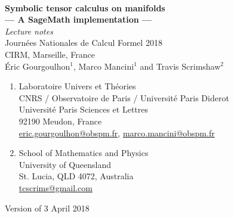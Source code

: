 \documentclass[12pt,a4paper]{book}
\begin{document}

\begin{titlepage}
\
\vspace{4cm}
\begin{center}
{\Huge\textbf{Symbolic tensor calculus on manifolds}}\\[2ex]
{\LARGE\textbf{--- A SageMath implementation ---}}\\[3ex]
{\LARGE\emph{Lecture notes}}\\[1ex]
{\Large Journées Nationales de Calcul Formel 2018\\[1ex]
CIRM, Marseille, France}\\[8ex]
{\large Éric Gourgoulhon$^1$, Marco Mancini$^1$ and Travis Scrimshaw$^2$}
\end{center}
\begin{enumerate}
\item Laboratoire Univers et Théories \\
CNRS / Observatoire de Paris / Université Paris Diderot\\
Université Paris Sciences et Lettres \\
92190 Meudon, France \\
\href{mailto:eric.gourgoulhon@obspm.fr}{eric.gourgoulhon@obspm.fr},
\href{mailto:marco.mancini@obspm.fr}{marco.mancini@obspm.fr}
\item School of Mathematics and Physics\\
University of Queensland \\
St. Lucia, QLD 4072, Australia \\
\href{mailto:tcscrims@gmail.com}{tcscrims@gmail.com}
\end{enumerate}
\begin{center}
Version of 3 April 2018
\end{center}
\end{titlepage}

\dominitoc

\newpage


\tableofcontents












\end{document}
